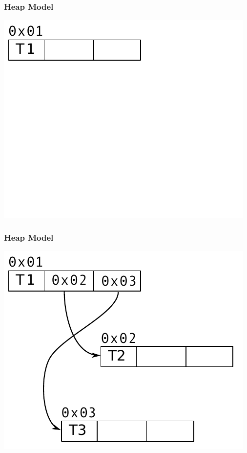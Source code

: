 \documentclass[utf8x]{beamer}
\begin{document}
\begin{frame}
  \frametitle{Heap Model}
  \includegraphics[scale=0.9]{figures/heap01}
\end{frame}

\begin{frame}
  \frametitle{Heap Model}
  \includegraphics[scale=0.9]{figures/heap02}
\end{frame}
\end{document}
